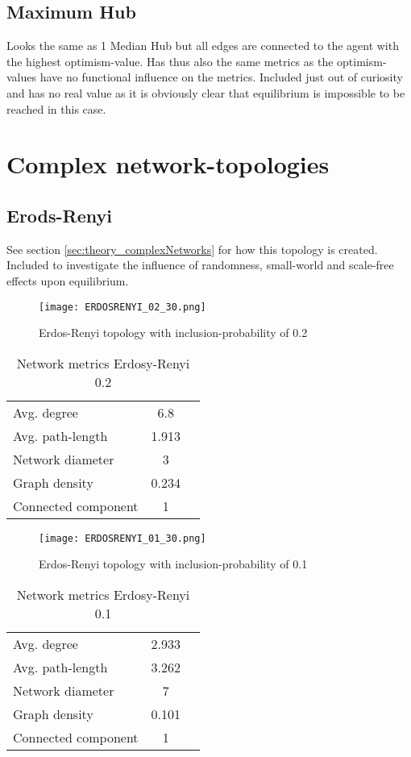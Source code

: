 \documentclass[Bachelorarbeit.tex]{subfiles}
\begin{document}
\subsection{Maximum Hub}
Looks the same as 1 Median Hub but all edges are connected to the agent with the highest optimism-value. Has thus also the same metrics as the optimism-values have no functional influence on the metrics.
\medskip
Included just out of curiosity and has no real value as it is obviously clear that equilibrium is impossible to be reached in this case.

\section{Complex network-topologies}
\subsection{Erods-Renyi}
See section \ref{sec:theory_complexNetworks} for how this topology is created.
\medskip
Included to investigate the influence of randomness, small-world and scale-free effects upon equilibrium.

\begin{figure}[H]
	\centering
  \texttt{[image: ERDOSRENYI\_02\_30.png]}
	\caption{Erdos-Renyi topology with inclusion-probability of 0.2}
	\label{fig:topology_ERDOSRENYI_02_30}
\end{figure}

\begin{table}[H]
	\centering
	\caption{Network metrics Erdosy-Renyi 0.2}
	\begin{tabular} { l c r }
		\hline
		Avg. degree & 6.8 \\
		Avg. path-length & 1.913 \\
		Network diameter & 3 \\
		Graph density & 0.234 \\
		Connected component & 1 \\
		\hline
	\end{tabular}
\end{table}

\begin{figure}[H]
	\centering
  \texttt{[image: ERDOSRENYI\_01\_30.png]}
	\caption{Erdos-Renyi topology with inclusion-probability of 0.1}
	\label{fig:topology_ERDOSRENYI_01_30}
\end{figure}

\begin{table}[H]
	\centering
	\caption{Network metrics Erdosy-Renyi 0.1}
	\begin{tabular} { l c r }
		\hline
		Avg. degree & 2.933 \\
		Avg. path-length & 3.262 \\
		Network diameter & 7 \\
		Graph density & 0.101 \\
		Connected component & 1 \\
		\hline
	\end{tabular}
\end{table}
\end{document}
